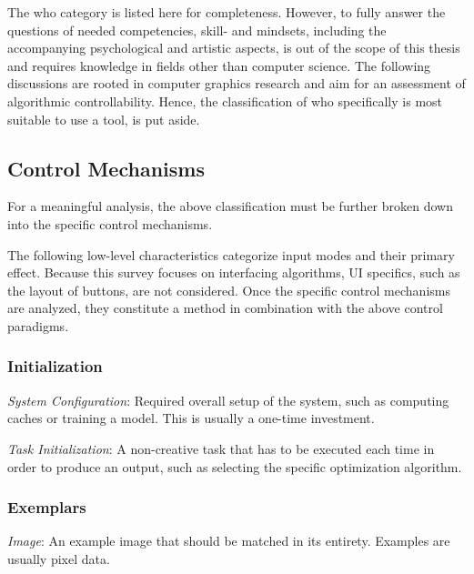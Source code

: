The who category is listed here for completeness. However, to fully answer the questions of needed competencies, skill- and mindsets, including the accompanying psychological and artistic aspects, is out of the scope of this thesis and requires knowledge in fields other than computer science. The following discussions are rooted in computer graphics research and aim for an assessment of algorithmic controllability. Hence, the classification of who specifically is most suitable to use a tool, is put aside.


\subsection{Control Mechanisms}
\label{subsec:taxo_control_mechanism}

For a meaningful analysis, the above classification must be further broken down into the specific control mechanisms. 

The following low-level characteristics categorize input modes and their primary effect. Because this survey focuses on interfacing algorithms, UI specifics, such as the layout of buttons, are not considered. Once the specific control mechanisms are analyzed, they constitute a method in combination with the above control paradigms.

\subsubsection{Initialization}



\textit{System Configuration}: Required overall setup of the system, such as computing caches or training a model. This is usually a one-time investment.

\textit{Task Initialization}: A non-creative task that has to be executed each time in order to produce an output, such as selecting the specific optimization algorithm.



\subsubsection{Exemplars}


\textit{Image}: An example image that should be matched in its entirety. Examples are usually pixel data.

